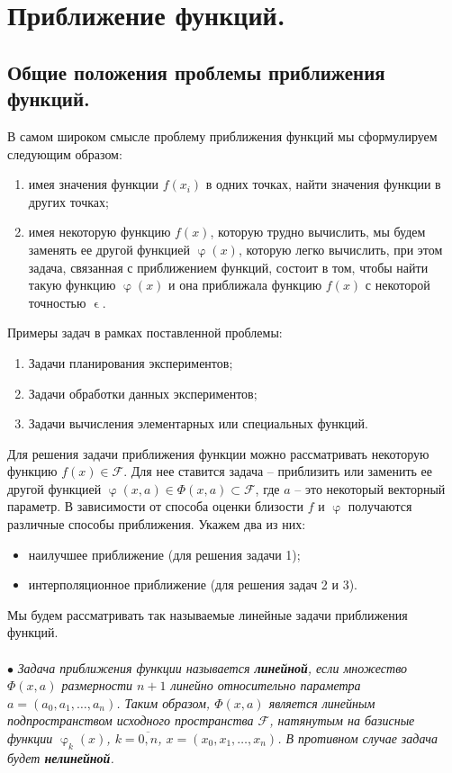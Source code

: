 \documentclass[a4paper, 12pt]{report}
\renewcommand{\varphi}{\upvarphi}
\renewcommand{\epsilon}{\upvarepsilon}
\begin{document}
\chapter{Приближение функций.}
\section{Общие положения проблемы приближения функций.}
В самом широком смысле проблему приближения функций мы сформулируем следующим образом:\begin{enumerate}
	\item имея значения функции $f(x_i)$ в одних точках, найти значения функции в других точках;
	\item имея некоторую функцию $f(x)$, которую трудно вычислить, мы будем заменять ее другой функцией $\varphi(x)$, которую легко вычислить, при этом задача, связанная с приближением функций, состоит в том, чтобы найти такую функцию $\varphi(x)$ и она приближала функцию $f(x)$ с некоторой точностью $\epsilon$.
\end{enumerate}
Примеры задач в рамках поставленной проблемы:
\begin{enumerate}
	\item Задачи планирования экспериментов;
	\item Задачи обработки данных экспериментов;
	\item Задачи вычисления элементарных или специальных функций.
\end{enumerate}
Для решения задачи приближения функции можно рассматривать некоторую функцию $f(x) \in \mathcal F$. Для нее ставится задача -- приблизить или заменить ее другой функцией $\varphi(x,a)\in \Phi (x, a)\subset \mathcal F$, где $a$ -- это некоторый векторный параметр. В зависимости от способа оценки близости $f$ и $\varphi$ получаются различные способы приближения. Укажем два из них:
\begin{itemize}
	\item наилучшее приближение (для решения задачи 1);
	\item интерполяционное приближение (для решения задач 2 и 3).
\end{itemize}
Мы будем рассматривать так называемые линейные задачи приближения функций.
\\\\ 
$\bullet$ \textit{Задача приближения функции называется \textbf{линейной}, если множество $\Phi(x,a)$ размерности $n+1$ линейно относительно параметра $a=(a_0,a_1,\ldots, a_n)$. Таким образом, $\Phi(x,a)$ является линейным подпространством исходного пространства $\mathcal{F}$, натянутым на базисные функции $\varphi_k(x)$, $k=\overline{0,n}$, $x = (x_0,x_1,\ldots, x_n)$. В противном случае задача будет \textbf{нелинейной}.}\\\\ 
\end{document}
